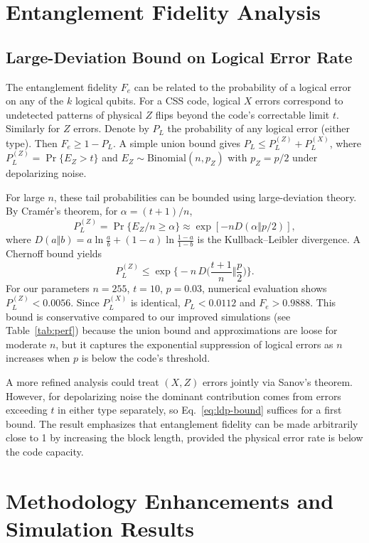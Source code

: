 \documentclass[conference]{IEEEtran}  %
\begin{document}
\section{Entanglement Fidelity Analysis}\label{sec:analysis}
\subsection{Large-Deviation Bound on Logical Error Rate}\label{sec:fidelity_bound}
The entanglement fidelity $F_e$ can be related to the probability of a logical error on any of the $k$ logical qubits. For a CSS code, logical $X$ errors correspond to undetected patterns of physical $Z$ flips beyond the code's correctable limit $t$. Similarly for $Z$ errors. Denote by $P_L$ the probability of any logical error (either type). Then $F_e \ge 1 - P_L$. A simple union bound gives $P_L \le P_L^{(Z)} + P_L^{(X)}$, where $P_L^{(Z)} = \Pr\{E_Z > t\}$ and $E_Z \sim \mathrm{Binomial}(n,p_Z)$ with $p_Z=p/2$ under depolarizing noise.

For large $n$, these tail probabilities can be bounded using large-deviation theory. By Cramér's theorem, for $\alpha = (t+1)/n$,
\[
  P_L^{(Z)} = \Pr\{E_Z/n \ge \alpha\} \approx \exp[-n D(\alpha\Vert p/2)],
\]
where $D(a\Vert b) = a\ln\frac{a}{b} + (1-a)\ln\frac{1-a}{1-b}$ is the Kullback--Leibler divergence. A Chernoff bound yields
\begin{equation}
P_L^{(Z)} \le \exp\Big\{-n \, D\!\Big(\frac{t+1}{n}\Big\Vert \frac{p}{2}\Big)\Big\}.
\label{eq:ldp-bound}
\end{equation}
For our parameters $n=255$, $t=10$, $p=0.03$, numerical evaluation shows $P_L^{(Z)} < 0.0056$.  Since $P_L^{(X)}$ is identical, $P_L < 0.0112$ and $F_e > 0.9888$.  This bound is conservative compared to our improved simulations (see Table~\ref{tab:perf}) because the union bound and approximations are loose for moderate $n$, but it captures the exponential suppression of logical errors as $n$ increases when $p$ is below the code's threshold.

A more refined analysis could treat $(X,Z)$ errors jointly via Sanov's theorem. However, for depolarizing noise the dominant contribution comes from errors exceeding $t$ in either type separately, so Eq.~\eqref{eq:ldp-bound} suffices for a first bound. The result emphasizes that entanglement fidelity can be made arbitrarily close to 1 by increasing the block length, provided the physical error rate is below the code capacity.

\section{Methodology Enhancements and Simulation Results}\label{sec:enhancements}
\end{document}
